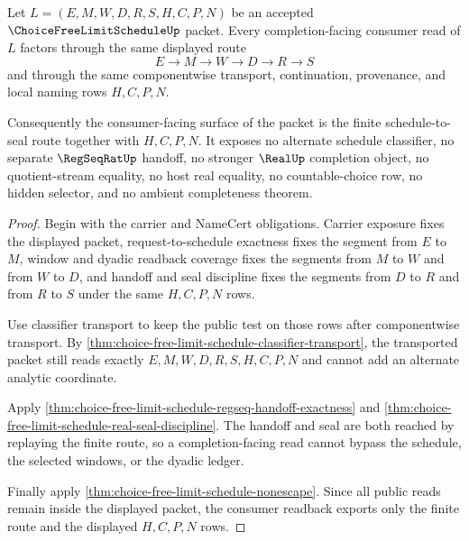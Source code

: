 \begin{theorem}
\label{thm:choice-free-limit-schedule-consumer-readback}
Let $L=(E,M,W,D,R,S,H,C,P,N)$ be an accepted $\ChoiceFreeLimitScheduleUp$ packet. Every completion-facing consumer read of $L$ factors through the same displayed route
$$
E \to M \to W \to D \to R \to S
$$
and through the same componentwise transport, continuation, provenance, and local naming rows $H,C,P,N$.

Consequently the consumer-facing surface of the packet is the finite schedule-to-seal route together with $H,C,P,N$. It exposes no alternate schedule classifier, no separate $\RegSeqRatUp$ handoff, no stronger $\RealUp$ completion object, no quotient-stream equality, no host real equality, no countable-choice row, no hidden selector, and no ambient completeness theorem.
\end{theorem}
\begin{proof}
Begin with the carrier and NameCert obligations. Carrier exposure fixes the displayed packet, request-to-schedule exactness fixes the segment from $E$ to $M$, window and dyadic readback coverage fixes the segments from $M$ to $W$ and from $W$ to $D$, and handoff and seal discipline fixes the segments from $D$ to $R$ and from $R$ to $S$ under the same $H,C,P,N$ rows.

Use classifier transport to keep the public test on those rows after componentwise transport. By \autoref{thm:choice-free-limit-schedule-classifier-transport}, the transported packet still reads exactly $E,M,W,D,R,S,H,C,P,N$ and cannot add an alternate analytic coordinate.

Apply \autoref{thm:choice-free-limit-schedule-regseq-handoff-exactness} and \autoref{thm:choice-free-limit-schedule-real-seal-discipline}. The handoff and seal are both reached by replaying the finite route, so a completion-facing read cannot bypass the schedule, the selected windows, or the dyadic ledger.

Finally apply \autoref{thm:choice-free-limit-schedule-nonescape}. Since all public reads remain inside the displayed packet, the consumer readback exports only the finite route and the displayed $H,C,P,N$ rows.
\end{proof}

